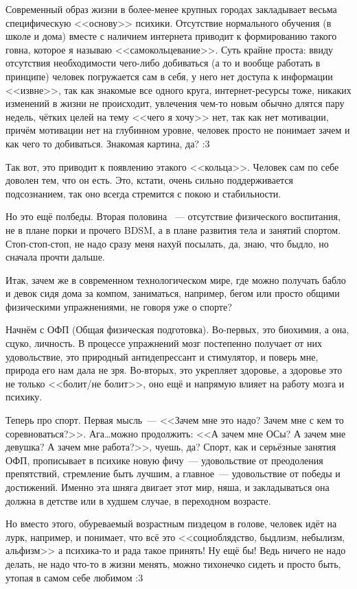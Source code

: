 \documentclass[a5paper,12pt,twoside]{memoir}
\begin{document}
Современный образ жизни в более-менее крупных городах закладывает весьма специфическую <<основу>> психики. Отсутствие нормального обучения (в школе и дома) вместе с наличием интернета приводит к формированию такого говна, которое я называю <<самокольцевание>>. Суть крайне проста: ввиду отсутствия необходимости чего-либо добиваться (а то и вообще работать в принципе) человек погружается сам в себя, у него нет доступа к информации <<извне>>, так как знакомые все одного круга, интернет-ресурсы тоже, никаких изменений в жизни не происходит, увлечения чем-то новым обычно длятся пару недель, чётких целей на тему <<чего я хочу>> нет, так как нет мотивации, причём мотивации нет на глубинном уровне, человек просто не понимает зачем и как чего то добиваться. Знакомая картина, да? :3

Так вот, это приводит к появлению этакого <<кольца>>. Человек сам по себе доволен тем, что он есть. Это, кстати, очень сильно поддерживается подсознанием, так оно всегда стремится с покою и стабильности.

Но это ещё полбеды. Вторая половина ~--- отсутствие физического воспитания, не в плане порки и прочего BDSM, а в плане развития тела и занятий спортом. Стоп-стоп-стоп, не надо сразу меня нахуй посылать, да, знаю, что быдло, но сначала прочти дальше. 

Итак, зачем же в современном технологическом мире, где можно получать бабло и девок сидя дома за компом, заниматься, например, бегом или просто общими физическими упражнениями, не говоря уже о спорте?

Начнём с ОФП (Общая физическая подготовка). Во-первых, это биохимия, а она, сцуко, личность. В процессе упражнений мозг постепенно получает от них удовольствие, это природный антидепрессант и стимулятор, и поверь мне, природа его нам дала не зря. Во-вторых, это укрепляет здоровье, а здоровье это не только <<болит/не болит>>, оно ещё и напрямую влияет на работу мозга и психику.

Теперь про спорт. Первая мысль~--- <<Зачем мне это надо? Зачем мне с кем то соревноваться?>>. Ага\ldots мож\-но продолжить: <<А зачем мне ОСы? А зачем мне девушка? А зачем мне работа?>>, чуешь, да? Спорт, как и серьёзные занятия ОФП, прописывает в психике новую фичу~--- удовольствие от преодоления препятствий, стремление быть лучшим, а главное~--- удовольствие от победы и достижений. Именно эта шняга двигает этот мир, няша, и закладываться она должна в детстве или в худшем случае, в переходном возрасте.

Но вместо этого, обуреваемый возрастным пиздецом в голове, человек идёт на лурк, например, и понимает, что всё это <<социоблядство, быдлизм, небылизм, альфизм>> а психика-то и рада такое принять! Ну ещё бы! Ведь ничего не надо делать, не надо что-то в жизни менять, можно тихонечко сидеть и просто быть, утопая в самом себе любимом :3
\end{document}
